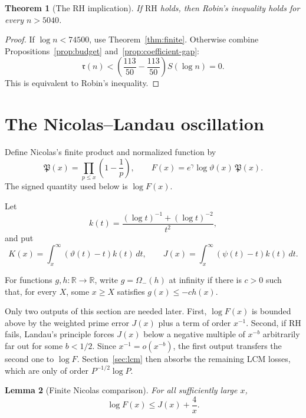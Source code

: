 \documentclass[11pt]{amsart}
\newtheorem{theorem}{Theorem}[section]
\newtheorem{lemma}[theorem]{Lemma}
\theoremstyle{definition}
\theoremstyle{remark}
\numberwithin{equation}{section}
\newcommand{\RH}{\mathrm{RH}}
\newcommand{\R}{\mathbb{R}}
\newcommand{\euler}{\gamma}
\newcommand{\M}{\mathfrak r}
\newcommand{\Pprod}{\mathfrak{P}}
\begin{document}
\begin{theorem}[The RH implication]\label{thm:rh-forward}
If $\RH$ holds, then Robin's inequality holds for every $n>5040$.
\end{theorem}

\begin{proof}
If $\log n<74500$, use Theorem~\ref{thm:finite}.  Otherwise combine
Propositions~\ref{prop:budget} and~\ref{prop:coefficient-gap}:
\[
  \M(n)
  <\left(\frac{113}{50}-\frac{113}{50}\right)S(\log n)
  =0.
\]
This is equivalent to Robin's inequality.
\end{proof}

\section{The Nicolas--Landau oscillation}\label{sec:oscillation}

Define Nicolas's finite product and normalized function by
\begin{equation}\label{eq:nicolas-function}
  \Pprod(x)=\prod_{p\le x}\left(1-\frac1p\right),
  \qquad
  F(x)=e^{\euler}\log\vartheta(x)\,\Pprod(x).
\end{equation}
The signed quantity used below is $\log F(x)$.

Let
\[
  k(t)=\frac{(\log t)^{-1}+(\log t)^{-2}}{t^2},
\]
and put
\begin{equation}\label{eq:KJ}
 K(x)=\int_x^{\infty}(\vartheta(t)-t)k(t)\,dt,
 \qquad
 J(x)=\int_x^{\infty}(\psi(t)-t)k(t)\,dt.
\end{equation}

For functions $g,h:\R\to\R$, write $g=\Omega_-(h)$ at infinity if there
is $c>0$ such that, for every $X$, some $x\ge X$ satisfies
$g(x)\le-c h(x)$.

Only two outputs of this section are needed later.  First,
$\log F(x)$ is bounded above by the weighted prime error $J(x)$ plus a term
of order $x^{-1}$.  Second, if $\RH$ fails, Landau's principle forces
$J(x)$ below a negative multiple of $x^{-b}$ arbitrarily far out for some
$b<1/2$.  Since $x^{-1}=o(x^{-b})$, the first output transfers the second
one to $\log F$.  Section~\ref{sec:lcm} then absorbs the remaining LCM
losses, which are only of order $P^{-1/2}\log P$.

\begin{lemma}[Finite Nicolas comparison]\label{lem:nicolas-comparison}
For all sufficiently large $x$,
\begin{equation}\label{eq:nicolas-upper}
  \log F(x)\le J(x)+\frac4x.
\end{equation}
\end{lemma}
\end{document}
